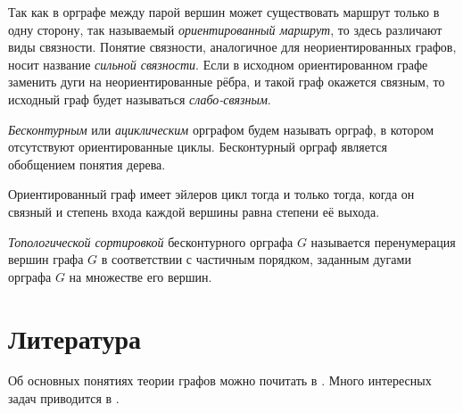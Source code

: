 Так как в орграфе между парой вершин может существовать маршрут только в одну 
сторону, так называемый \emph{ориентированный маршрут}, то здесь различают виды 
связности. Понятие связности, аналогичное для неориентированных графов, носит 
название \emph{сильной связности}. Если в исходном ориентированном графе 
заменить дуги на неориентированные рёбра, и такой граф окажется связным, то 
исходный граф будет называться \emph{слабо-связным}.

\emph{Бесконтурным} или \emph{ациклическим} орграфом будем называть орграф, в 
котором отсутствуют ориентированные циклы. Бесконтурный орграф является 
обобщением понятия дерева.

\begin{theorem}
Ориентированный граф имеет эйлеров цикл тогда и только тогда, когда он связный 
и степень входа каждой вершины равна степени её выхода.
\end{theorem}


\emph{Топологической сортировкой} бесконтурного орграфа $G$ называется 
перенумерация вершин графа $G$ в соответствии с частичным порядком, заданным 
дугами орграфа $G$ на множестве его вершин.

\section{Литература}

Об основных понятиях теории графов можно почитать в \cite{Okulov}. Много 
интересных задач приводится в \cite{Lando}.
